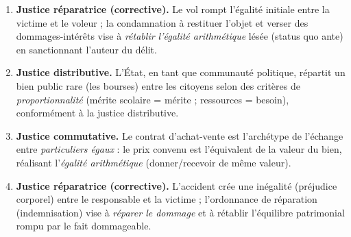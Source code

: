 \documentclass[11pt]{article}
\begin{document}
\begin{corrige}
\begin{enumerate}
\item \textbf{Justice réparatrice (corrective).} Le vol rompt l'égalité initiale entre la victime et le voleur ; la condamnation à restituer l'objet et verser des dommages-intérêts vise à \emph{rétablir l'égalité arithmétique} lésée (status quo ante) en sanctionnant l'auteur du délit.
\item \textbf{Justice distributive.} L'État, en tant que communauté politique, répartit un bien public rare (les bourses) entre les citoyens selon des critères de \emph{proportionnalité} (mérite scolaire = mérite ; ressources = besoin), conformément à la justice distributive.
\item \textbf{Justice commutative.} Le contrat d'achat-vente est l'archétype de l'échange entre \emph{particuliers égaux} : le prix convenu est l'équivalent de la valeur du bien, réalisant l'\emph{égalité arithmétique} (donner/recevoir de même valeur).
\item \textbf{Justice réparatrice (corrective).} L'accident crée une inégalité (préjudice corporel) entre le responsable et la victime ; l'ordonnance de réparation (indemnisation) vise à \emph{réparer le dommage} et à rétablir l'équilibre patrimonial rompu par le fait dommageable.
\end{enumerate}
\end{corrige}
\end{document}
